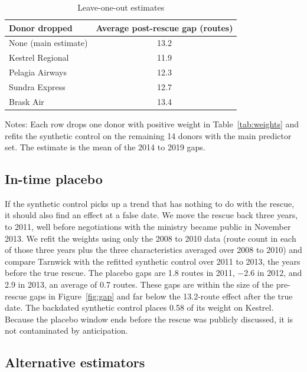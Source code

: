 \documentclass[12pt]{article}
\begin{document}
\begin{table}[ht]
\centering
\begin{threeparttable}
\caption{Leave-one-out estimates}
\label{tab:loo}
\begin{tabular}{lc}
\toprule
Donor dropped & Average post-rescue gap (routes) \\
\midrule
None (main estimate) & 13.2 \\
Kestrel Regional & 11.9 \\
Pelagia Airways & 12.3 \\
Sundra Express & 12.7 \\
Brask Air & 13.4 \\
\bottomrule
\end{tabular}
\begin{tablenotes}\footnotesize
\item Notes: Each row drops one donor with positive weight in Table~\ref{tab:weights} and refits the synthetic control on the remaining 14 donors with the main predictor set. The estimate is the mean of the 2014 to 2019 gaps.
\end{tablenotes}
\end{threeparttable}
\end{table}

\subsection{In-time placebo}

If the synthetic control picks up a trend that has nothing to do with the rescue, it should also find an effect at a false date. We move the rescue back three years, to 2011, well before negotiations with the ministry became public in November 2013. We refit the weights using only the 2008 to 2010 data (route count in each of those three years plus the three characteristics averaged over 2008 to 2010) and compare Tarnwick with the refitted synthetic control over 2011 to 2013, the years before the true rescue. The placebo gaps are 1.8 routes in 2011, $-2.6$ in 2012, and 2.9 in 2013, an average of 0.7 routes. These gaps are within the size of the pre-rescue gaps in Figure~\ref{fig:gap} and far below the 13.2-route effect after the true date. The backdated synthetic control places 0.58 of its weight on Kestrel. Because the placebo window ends before the rescue was publicly discussed, it is not contaminated by anticipation.

\subsection{Alternative estimators}
\end{document}
